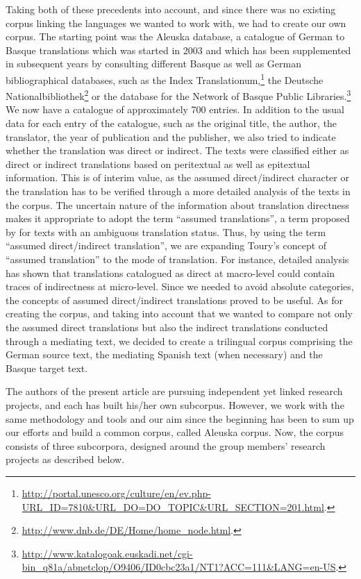 \documentclass[output=paper]{LSP/langsci}
\begin{document}
Taking both of these precedents into account, and since there was no existing corpus linking the languages we wanted to work with, we had to create our own corpus. The starting point was the Aleuska database, a catalogue of German to Basque translations which was started in 2003 and which has been supplemented in subsequent years by consulting different Basque as well as German bibliographical databases, such as the Index Translationum,\footnote{\url{http://portal.unesco.org/culture/en/ev.php-URL_ID=7810&URL_DO=DO_TOPIC&URL_SECTION=201.html}.} the Deutsche Nationalbibliothek\footnote{\url{http://www.dnb.de/DE/Home/home_node.html}.} or the database for the Network of Basque Public Libraries.\footnote{\url{http://www.katalogoak.euskadi.net/cgi-bin_q81a/abnetclop/O9406/ID0cbc23a1/NT1?ACC=111&LANG=en-US}.} We now have a catalogue of approximately 700 entries. In addition to the usual data for each entry of the catalogue, such as the original title, the author, the translator, the year of publication and the publisher, we also tried to indicate whether the translation was direct or indirect. The texts were classified either as direct or indirect translations based on peritextual as well as epitextual information. This is of interim value, as the assumed direct/indirect character or the translation has to be verified through a more detailed analysis of the texts in the corpus. The uncertain nature of the information about translation directness makes it appropriate to adopt the term “assumed translations”, a term proposed by \citet{Toury1995} for texts with an ambiguous translation status. Thus, by using the term “assumed direct/indirect translation”, we are expanding Toury's concept of “assumed translation” to the mode of translation. For instance, detailed analysis has shown that translations catalogued as direct at macro-level could contain traces of indirectness at micro-level. Since we needed to avoid absolute categories, the concepts of assumed direct/indirect translations proved to be useful. As for creating the corpus, and taking into account that we wanted to compare not only the assumed direct translations but also the indirect translations conducted through a mediating text, we decided to create a trilingual corpus comprising the German source text, the mediating Spanish text (when necessary) and the Basque target text. \enlargethispage{1\baselineskip}

The authors of the present article are pursuing independent yet linked research projects, and each has built his/her own subcorpus. However, we work with the same methodology and tools and our aim since the beginning has been to sum up our efforts and build a common corpus, called Aleuska corpus. Now, the corpus consists of three subcorpora, designed around the group members' research projects as described below.
\end{document}
